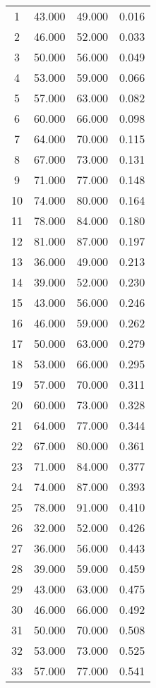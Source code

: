 % 
\begin{tabular}{cccc}
  \hline
  \hline
1 & 43.000 & 49.000 & 0.016 \\ 
  2 & 46.000 & 52.000 & 0.033 \\ 
  3 & 50.000 & 56.000 & 0.049 \\ 
  4 & 53.000 & 59.000 & 0.066 \\ 
  5 & 57.000 & 63.000 & 0.082 \\ 
  6 & 60.000 & 66.000 & 0.098 \\ 
  7 & 64.000 & 70.000 & 0.115 \\ 
  8 & 67.000 & 73.000 & 0.131 \\ 
  9 & 71.000 & 77.000 & 0.148 \\ 
  10 & 74.000 & 80.000 & 0.164 \\ 
  11 & 78.000 & 84.000 & 0.180 \\ 
  12 & 81.000 & 87.000 & 0.197 \\ 
  13 & 36.000 & 49.000 & 0.213 \\ 
  14 & 39.000 & 52.000 & 0.230 \\ 
  15 & 43.000 & 56.000 & 0.246 \\ 
  16 & 46.000 & 59.000 & 0.262 \\ 
  17 & 50.000 & 63.000 & 0.279 \\ 
  18 & 53.000 & 66.000 & 0.295 \\ 
  19 & 57.000 & 70.000 & 0.311 \\ 
  20 & 60.000 & 73.000 & 0.328 \\ 
  21 & 64.000 & 77.000 & 0.344 \\ 
  22 & 67.000 & 80.000 & 0.361 \\ 
  23 & 71.000 & 84.000 & 0.377 \\ 
  24 & 74.000 & 87.000 & 0.393 \\ 
  25 & 78.000 & 91.000 & 0.410 \\ 
  26 & 32.000 & 52.000 & 0.426 \\ 
  27 & 36.000 & 56.000 & 0.443 \\ 
  28 & 39.000 & 59.000 & 0.459 \\ 
  29 & 43.000 & 63.000 & 0.475 \\ 
  30 & 46.000 & 66.000 & 0.492 \\ 
  31 & 50.000 & 70.000 & 0.508 \\ 
  32 & 53.000 & 73.000 & 0.525 \\ 
  33 & 57.000 & 77.000 & 0.541 \\ 

\end{tabular}

